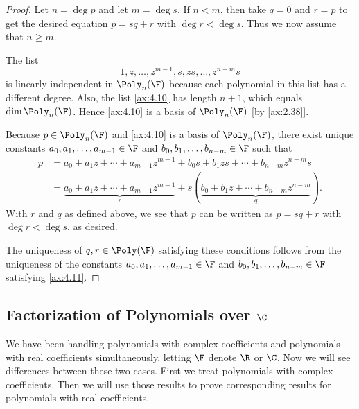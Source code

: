 \begin{proof}
Let $n=\deg p$ and let $m=\deg s$. If $n<m$, then take $q=0$ and $r=p$ to get
the desired equation $p=sq+r$ with $\deg r<\deg s$. Thus we now assume that
$n\ge m$.

The list
\begin{equation*}
1,z,\dots,z^{m-1},s,zs,\dots,z^{n-m}s
\tag*{\thetheorem}\label{ax:4.10}
\end{equation*}
is linearly independent in $\Poly_n(\F)$ because each polynomial in this list
has a different degree. Also, the list \ref{ax:4.10} has length $n+1$, which
equals $\dim\Poly_n(\F)$. Hence \ref{ax:4.10} is a basis of $\Poly_n(\F)$
[by \ref{ax:2.38}].

Because $p\in\Poly_n(\F)$ and \ref{ax:4.10} is a basis of $\Poly_n(\F)$, there
exist unique constants $a_0,a_1,\dots,a_{m-1}\in\F$ and
$b_0,b_1,\dots,b_{n-m}\in\F$ such that
\begin{align*}
p &= a_0+a_1z+\cdots+a_{m-1}z^{m-1}+b_0s+b_1zs+\cdots+b_{n-m}z^{n-m}s
  \tag*{\thetheorem}\label{ax:4.11}\\
  &= \underbrace{a_0+a_1z+\cdots+a_{m-1}z^{m-1}}_{r}
     +s(\underbrace{b_0+b_1z+\cdots+b_{n-m}z^{n-m}}_{q}).
\end{align*}
With $r$ and $q$ as defined above, we see that $p$ can be written as
$p=sq+r$ with $\deg r<\deg s$, as desired.

The uniqueness of $q,r\in\Poly(\F)$ satisfying these conditions follows from
the uniqueness of the constants $a_0,a_1,\dots,a_{m-1}\in\F$ and
$b_0,b_1,\dots,b_{n-m}\in\F$ satisfying \ref{ax:4.11}.
\end{proof}

\subsection{\texorpdfstring{Factorization of Polynomials over $\C$}%
{Factorization of Polynomials over C}}

%
We have been handling polynomials with complex coefficients and polynomials
with real coefficients simultaneously, letting $\F$ denote $\R$ or $\C$. Now we
will see differences between these two cases. First we treat polynomials with
complex coefficients. Then we will use those results to prove corresponding
results for polynomials with real coefficients.

